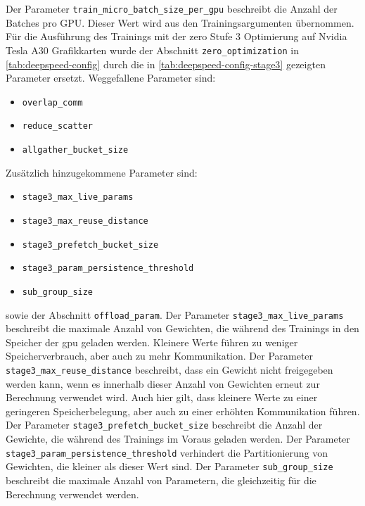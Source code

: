 Der Parameter \texttt{train\_micro\_batch\_size\_per\_gpu} beschreibt die Anzahl der Batches pro GPU.
Dieser Wert wird aus den Trainingsargumenten übernommen.\\

Für die Ausführung des Trainings mit der \ac{zero} Stufe 3 Optimierung auf Nvidia Tesla A30 Grafikkarten wurde der Abschnitt \texttt{zero\_optimization} in \cref{tab:deepspeed-config} durch die in \cref{tab:deepspeed-config-stage3} gezeigten Parameter ersetzt.
Weggefallene Parameter sind:
\begin{itemize}
    \item \texttt{overlap\_comm}
    \item \texttt{reduce\_scatter}
    \item \texttt{allgather\_bucket\_size}
\end{itemize}

Zusätzlich hinzugekommene Parameter sind:
\begin{itemize}
    \item \texttt{stage3\_max\_live\_params}
    \item \texttt{stage3\_max\_reuse\_distance}
    \item \texttt{stage3\_prefetch\_bucket\_size}
    \item \texttt{stage3\_param\_persistence\_threshold}
    \item \texttt{sub\_group\_size}
\end{itemize}
sowie der Abschnitt \texttt{offload\_param}.
Der Parameter \texttt{stage3\_max\_live\_params} beschreibt die maximale Anzahl von Gewichten, die während des Trainings in den Speicher der \ac{gpu} geladen werden. Kleinere Werte führen zu weniger Speicherverbrauch, aber auch zu mehr Kommunikation.
Der Parameter \texttt{stage3\_max\_reuse\_distance} beschreibt, dass ein Gewicht nicht freigegeben werden kann, wenn es innerhalb dieser Anzahl von Gewichten erneut zur Berechnung verwendet wird. Auch hier gilt, dass kleinere Werte zu einer geringeren Speicherbelegung, aber auch zu einer erhöhten Kommunikation führen.
Der Parameter \texttt{stage3\_prefetch\_bucket\_size} beschreibt die Anzahl der Gewichte, die während des Trainings im Voraus geladen werden.
Der Parameter \texttt{stage3\_param\_persistence\_threshold} verhindert die Partitionierung von Gewichten, die kleiner als dieser Wert sind.
Der Parameter \texttt{sub\_group\_size} beschreibt die maximale Anzahl von Parametern, die gleichzeitig für die Berechnung verwendet werden.

